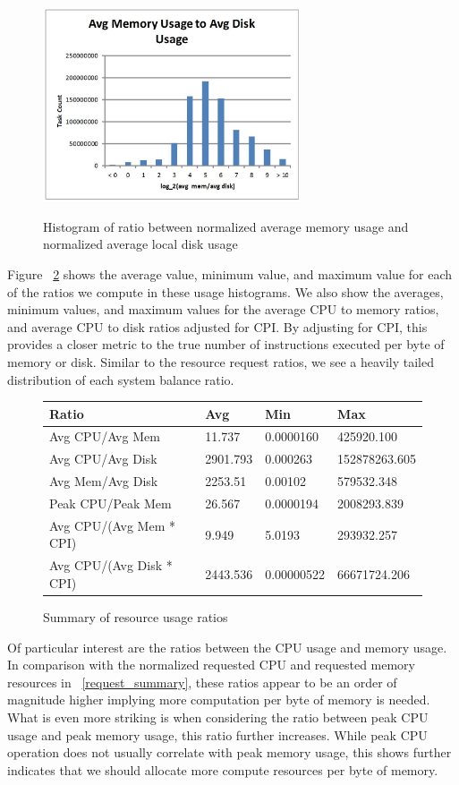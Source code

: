 \documentclass{sig-alternate}
\begin{document}
\begin{figure}
\centering
\includegraphics[width=3in]{../figures/avg_act_mem_disk.jpg}
\label{avg_act_mem_disk}
\caption{Histogram of ratio between normalized average memory usage and normalized average local disk usage}
\end{figure}

Figure ~\ref{actual_summary} shows the average value, minimum value, and maximum value for each of the ratios we compute in these usage histograms.
We also show the averages, minimum values, and maximum values for the average CPU to memory ratios, and average CPU to disk ratios adjusted for CPI.
By adjusting for CPI, this provides a closer metric to the true number of instructions executed per byte of memory or disk.
Similar to the resource request ratios, we see a heavily tailed distribution of each system balance ratio.

\begin{figure}
\centering
\begin{tabular}{| p{2.5cm} | p{1.5cm} | p{1.5cm} | p{1.5cm} |} \hline
Ratio & Avg & Min & Max \\ \hline
Avg CPU/Avg Mem & 11.737 & 0.0000160 & 425920.100  \\ \hline
Avg CPU/Avg Disk & 2901.793 & 0.000263 & 152878263.605 \\ \hline
Avg Mem/Avg Disk & 2253.51 & 0.00102 & 579532.348 \\ \hline
Peak CPU/Peak Mem & 26.567 & 0.0000194 & 2008293.839 \\ \hline
Avg CPU/(Avg Mem * CPI) & 9.949 & 5.0193 & 293932.257 \\ \hline
Avg CPU/(Avg Disk * CPI) & 2443.536 & 0.00000522 & 66671724.206 \\ \hline
\end{tabular}
\label{actual_summary}
\caption{Summary of resource usage ratios}
\end{figure}

Of particular interest are the ratios between the CPU usage and memory usage.
In comparison with the normalized requested CPU and requested memory resources in ~\ref{request_summary}, these ratios appear to be an order of magnitude higher implying more computation per byte of memory is needed.
What is even more striking is when considering the ratio between peak CPU usage and peak memory usage, this ratio further increases.
While peak CPU operation does not usually correlate with peak memory usage, this shows further indicates that we should allocate more compute resources per byte of memory.
\end{document}
